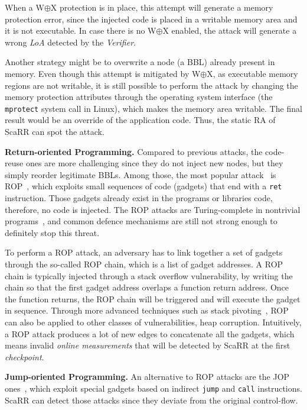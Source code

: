When a W$\oplus$X protection is in place, this attempt will generate a memory 
protection error, since the injected code is placed in a writable memory area 
and it is not executable. In case there is no W$\oplus$X enabled, the attack 
will generate a wrong \emph{LoA} detected by the \emph{Verifier}.

Another strategy might be to overwrite a node (\ie a BBL) already present in 
memory. 
Even though this attempt is mitigated by W$\oplus$X, as executable memory 
regions are not writable, it is still possible to perform the attack by 
changing the memory protection attributes through the operating system 
interface (\eg the \texttt{mprotect} system call in Linux), which makes the 
memory area writable. 
The final result would be an override of the application code. Thus, the static 
RA of ScaRR can spot the attack.

\textbf{Return-oriented Programming.}
Compared to previous attacks, the code-reuse ones are more challenging since 
they do not inject new nodes, but they simply reorder legitimate BBLs. Among 
those, the most popular attack~\cite{shacham2007geometry} is 
ROP~\cite{carlini2014rop}, which
exploits small sequences of code (gadgets) that end with a \texttt{ret} 
instruction. Those gadgets already exist in the programs or libraries code, 
therefore, no code is injected. The ROP attacks are Turing-complete in 
nontrivial programs~\cite{carlini2014rop}, and common defence mechanisms are 
still not strong enough to definitely stop this threat.

To perform a ROP attack, an adversary has to link together a set of gadgets 
through the so-called ROP chain, which is a list of gadget addresses. A ROP 
chain is typically injected through a stack overflow vulnerability, by writing 
the chain so that the first gadget address overlaps a function return address. 
Once the function returns, the ROP chain will be triggered and will execute the 
gadget in sequence. Through more advanced techniques such as stack 
pivoting~\cite{PracticalROP}, ROP can also be applied to other classes of 
vulnerabilities, \eg heap corruption.
Intuitively, a ROP attack produces a lot of new edges to concatenate all the 
gadgets, which means invalid \emph{online measurements} that will be detected 
by ScaRR at the first \emph{checkpoint}. 

\textbf{Jump-oriented Programming.}
An alternative to ROP attacks are the JOP 
ones~\cite{yao2013jop,bletsch2011jump}, which exploit special gadgets based on 
indirect \texttt{jump} and \texttt{call} instructions.
ScaRR can detect those attacks since they deviate from the original 
control-flow.

